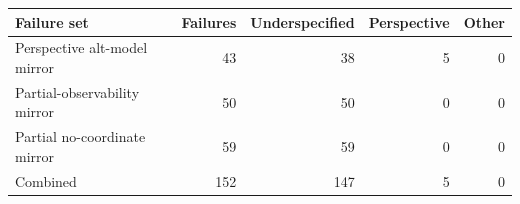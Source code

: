 \begin{tabular}{lrrrr}
\toprule
Failure set & Failures & Underspecified & Perspective & Other \\
\midrule
Perspective alt-model mirror & 43 & 38 & 5 & 0 \\
Partial-observability mirror & 50 & 50 & 0 & 0 \\
Partial no-coordinate mirror & 59 & 59 & 0 & 0 \\
\midrule
Combined & 152 & 147 & 5 & 0 \\
\bottomrule
\end{tabular}
